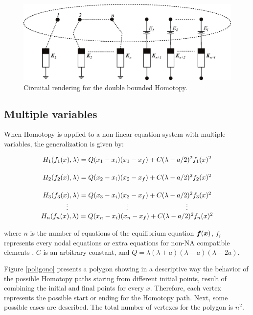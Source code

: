 \documentclass[conference,letterpaper,onecolumn]{IEEEtran}
\newcommand{\pig}[1]{\mbox{\boldmath ${#1}$}	}
\begin{document}
{\begin{figure}[tbp]
\centering
\includegraphics[scale=0.75]{figs/circ_1.eps}
\caption{Circuital rendering for the double bounded Homotopy.}
\label{circ1}
\end{figure}

\subsection{Multiple variables}

When Homotopy is applied to a non-linear equation system with multiple variables, the generalization is given by:

\begin{displaymath}
\begin{array}{c}
H_1(f_1(x),\lambda)=Q(x_1-x_i)(x_1-x_f)+C(\lambda-a/2)^2f_1(x)^2 \vspace{5mm} \\
H_2(f_2(x),\lambda)=Q(x_2-x_i)(x_2-x_f)+C(\lambda-a/2)^2f_2(x)^2 \vspace{5mm} \\
H_3(f_3(x),\lambda)=Q(x_3-x_i)(x_3-x_f)+C(\lambda-a/2)^2f_3(x)^2 \\
\vdots  \hspace{30mm} \vdots  \hspace{30mm} \vdots \\
H_n(f_n(x),\lambda)=Q(x_n-x_i)(x_n-x_f)+C(\lambda-a/2)^2f_n(x)^2 \\
\end{array}
\end{displaymath}

where $n$ is the number of equations of the equilibrium equation $\pig{f}(\pig{x})$, $f_i$ represents every nodal equations or extra equations for non-NA compatible elements \cite{mnaxx}, $C$ is an arbitrary constant, and $Q=\lambda(\lambda+a)(\lambda-a)(\lambda-2a)$.

Figure \ref{poligono} presents a polygon showing in a descriptive way the behavior of the possible Homotopy paths staring from different initial points, result of combining the initial and final points for every $x$. Therefore, each vertex represents the possible start or ending for the Homotopy path. Next, some possible cases are described. The total number of vertexes for the polygon is $n^2$. 

}
\end{document}
